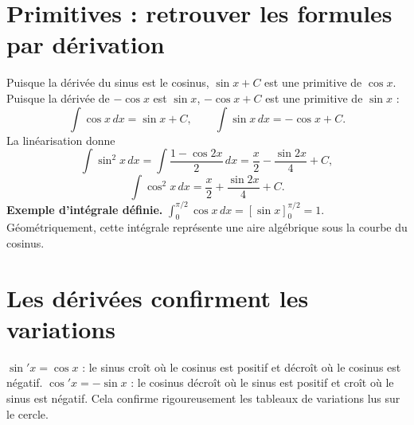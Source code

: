 \documentclass[../cours_spe_trigo.tex]{subfiles}
\begin{document}
\section{Primitives : retrouver les formules par dérivation}
Puisque la dérivée du sinus est le cosinus, $\sin x+C$ est une primitive de $\cos x$. Puisque la dérivée de $-\cos x$ est $\sin x$, $-\cos x+C$ est une primitive de $\sin x$ :
\[
\boxed{\int\cos x\,dx=\sin x+C,\qquad\int\sin x\,dx=-\cos x+C.}
\]
La linéarisation donne
\[
\int\sin^2x\,dx=\int\frac{1-\cos2x}{2}\,dx
=\boxed{\frac x2-\frac{\sin2x}{4}+C},
\]
\[
\int\cos^2x\,dx=\boxed{\frac x2+\frac{\sin2x}{4}+C}.
\]
\textbf{Exemple d'intégrale définie.} $\int_0^{\pi/2}\cos x\,dx=[\sin x]_0^{\pi/2}=1$. Géométriquement, cette intégrale représente une aire algébrique sous la courbe du cosinus.

\section{Les dérivées confirment les variations}
$\sin' x=\cos x$ : le sinus croît où le cosinus est positif et décroît où le cosinus est négatif. $\cos' x=-\sin x$ : le cosinus décroît où le sinus est positif et croît où le sinus est négatif. Cela confirme rigoureusement les tableaux de variations lus sur le cercle.
\end{document}
